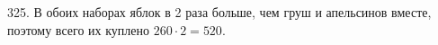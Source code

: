 325. В обоих наборах яблок в 2 раза больше, чем груш и апельсинов вместе, поэтому всего их куплено $260\cdot2=520.$\\
